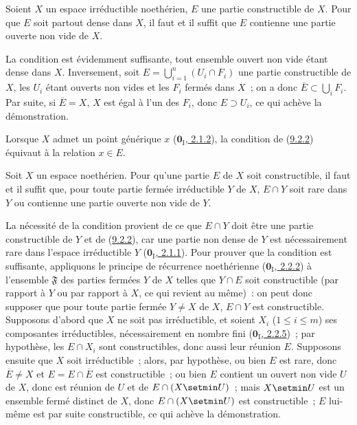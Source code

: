 \begin{proposition}[9.2.2]
\label{0.9.2.2-fr}
Soient $X$ un espace irréductible noethérien, $E$ une partie constructible de
$X$. Pour que $E$ soit partout dense dans $X$, il faut et il suffit que $E$
contienne une partie ouverte non vide de $X$.
\end{proposition}

La condition est évidemment suffisante, tout ensemble ouvert non vide étant
dense dans $X$. Inversement, soit
$E=\bigcup_{i=1}^n(U_i\cap F_i)$ une partie constructible de $X$, les $U_i$
étant ouverts non vides et les $F_i$ fermés dans $X$~; on a donc
$\overline{E}\subset\bigcup_i F_i$. Par suite, si $\overline{E}=X$, $X$ est
égal à l'un des $F_i$, donc $E\supset U_i$, ce qui achève la démonstration.

Lorsque $X$ admet un point générique $x$
(\hyperref[0.2.1.2-fr]{$\mathbf{0}_{\mathrm I}$, 2.1.2}), la condition de
(\hyperref[0.9.2.2-fr]{9.2.2}) équivaut à la relation $x\in E$.

\begin{proposition}[9.2.3]
\label{0.9.2.3-fr}
Soit $X$ un espace noethérien. Pour qu'une partie $E$ de $X$ soit
constructible, il faut et il suffit que, pour toute partie fermée
irréductible $Y$ de $X$, $E\cap Y$ soit rare dans $Y$ ou contienne une partie
ouverte non vide de $Y$.
\end{proposition}

La nécessité de la condition provient de ce que $E\cap Y$ doit être une
partie constructible de $Y$ et de (\hyperref[0.9.2.2-fr]{9.2.2}), car une
partie non dense de $Y$ est nécessairement rare dans l'espace irréductible
$Y$ (\hyperref[0.2.1.1-fr]{$\mathbf{0}_{\mathrm I}$, 2.1.1}). Pour prouver que la
condition est suffisante, appliquons le principe de récurrence noethérienne
(\hyperref[0.2.2.2-fr]{$\mathbf{0}_{\mathrm I}$, 2.2.2}) à l'ensemble
$\mathfrak{F}$ des parties fermées $Y$ de $X$ telles que $Y\cap E$ soit
constructible (par rapport à $Y$ ou par rapport à $X$, ce qui revient au
même)~: on peut donc supposer que pour toute partie fermée $Y\ne X$ de $X$,
$E\cap Y$ est constructible. Supposons d'abord que $X$ ne soit pas
irréductible, et soient $X_i$ ($1\leq i\leq m$) ses composantes
irréductibles, nécessairement en nombre fini
(\hyperref[0.2.2.5-fr]{$\mathbf{0}_{\mathrm I}$, 2.2.5})~; par hypothèse, les
$E\cap X_i$ sont constructibles, donc aussi leur réunion $E$. Supposons
ensuite que $X$ soit irréductible~; alors, par hypothèse, ou bien $E$ est
rare, donc $\overline{E}\ne X$ et $E=E\cap\overline{E}$ est constructible~;
ou bien $E$ contient un ouvert non vide $U$ de $X$, donc est réunion de $U$
et de $E\cap(X\setmin U)$~; mais $X\setmin U$ est un ensemble fermé
distinct de $X$, donc $E\cap(X\setmin U)$ est constructible~; $E$
lui-même est par suite constructible, ce qui achève la démonstration.

